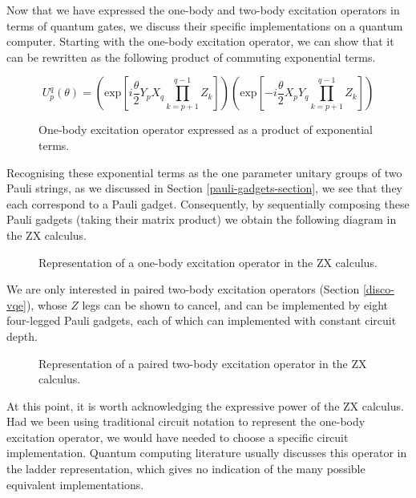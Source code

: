 Now that we have expressed the one-body and two-body excitation operators in terms of quantum gates, we discuss their specific implementations on a quantum computer. Starting with the one-body excitation operator, we can show that it can be rewritten as the following product of commuting exponential terms.

\begin{figure}[H]
    \centering
    \begin{equation*}
        U^q_p (\theta) =
        \left( \text{exp} \left[
        i \frac{\theta}{2} Y_p X_q \prod_{k=p+1}^{q-1} Z_k \right] \right)
        \left( \text{exp} \left[ -
        i \frac{\theta}{2} X_p Y_q \prod_{k=p+1}^{q-1} Z_k \right] \right)
    \end{equation*}
    \caption{One-body excitation operator expressed as a product of exponential terms.}
\end{figure}
\vspace{-10pt}

Recognising these exponential terms as the one parameter unitary groups of two Pauli strings, as we discussed in Section \ref{pauli-gadgets-section}, we see that they each correspond to a Pauli gadget. Consequently, by sequentially composing these Pauli gadgets (taking their matrix product) we obtain the following diagram in the ZX calculus. 

\begin{figure}[H]
    \centering
    \caption{Representation of a one-body excitation operator in the ZX calculus.}
\end{figure}

We are only interested in paired two-body excitation operators (Section \ref{disco-vqe}), whose $Z$ legs can be shown to cancel, and can be implemented by eight four-legged Pauli gadgets, each of which can implemented with constant circuit depth.

\begin{figure}[H]
    \centering
    \caption{Representation of a paired two-body excitation operator in the ZX calculus.}
\end{figure}

At this point, it is worth acknowledging the expressive power of the ZX calculus. Had we been using traditional circuit notation to represent the one-body excitation operator, we would have needed to choose a specific circuit implementation. Quantum computing literature usually discusses this operator in the ladder representation, which gives no indication of the many possible equivalent implementations.

